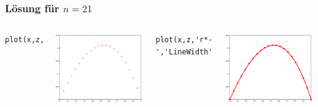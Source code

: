 \documentclass[hyperref={xetex}]{beamer}
\begin{document}
%
%
\begin{frame}[fragile]\frametitle{Lösung für $n=21$}
\begin{columns}[c]
\begin{lstlisting}[basicstyle=\tiny]
plot(x,z,'r*','MarkerSize',8)
\end{lstlisting}
\includegraphics[width=\textwidth]{figures/bild1_27_10}

\begin{lstlisting}[basicstyle=\tiny]
plot(x,z,'r*-','LineWidth',3,'MarkerSize',8)
\end{lstlisting}%
\includegraphics[width=\textwidth]{figures/bild2_27_10}
\end{columns}
\end{frame}
\end{document}
